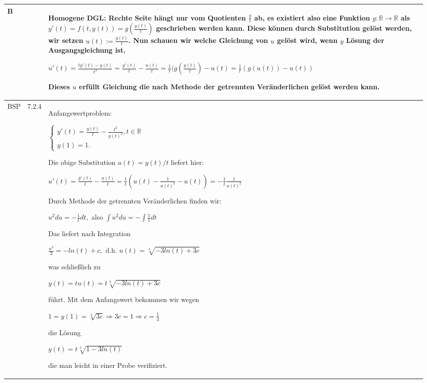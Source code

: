     \begin{longtable}{p{0.75cm} p{1cm} p{16cm}}
        \toprule

        B   &       &   Homogene DGL: Rechte Seite hängt nur vom Quotienten $\frac{y}{t}$ ab, es existiert also eine Funktion $g: \mathbb{R} \rightarrow \mathbb{R}$
                        als $y'(t) = f(t,y(t)) = g(\frac{y(t)}{t})$ geschrieben werden kann. \hfill \break
                        Diese können durch Substitution gelöst werden, wir setzen $u(t) := \frac{y(t)}{t}$. \hfill \break
                        Nun schauen wir welche Gleichung von $u$ gelöst wird, wenn $y$ Lösung der Ausgangsgleichung ist. \hfill \break
                        \centerline{$ u'(t) = \frac{ty'(t)-y(t)}{t^2} = \frac{y'(t)}{t} - \frac{u(t)}{t} = \frac{1}{t} (g(\frac{y(t)}{t}) - u(t)
                        = \frac{1}{t}(g(u(t))-u(t)) $} 
                        Dieses $u$ erfüllt Gleichung die nach Methode der getrennten Veränderlichen gelöst werden kann.\\
        \midrule
        BSP & 7.2.4 &   Anfangswertproblem: \hfill \break
                        \centerline{$   \begin{cases}
                                        y'(t) = \frac{y(t)}{t} - \frac{t^2}{y(t)^2}, t \in \mathbb{R} \\
                                        y(1) = 1. 
                                        \end{cases} $} 
                        Die obige Substitution $u(t) = y(t)/t$ liefert hier: \hfill \break
                        \centerline{$ u'(t)= \frac{y'(t)}{t} - \frac{u(t)}{t} = \frac{1}{t} (u(t) - \frac{1}{u(t)^2}-u(t)) = - \frac{1}{t} \frac{1}{u(t)^2} $} 
                        Durch Methode der getrennten Veränderlichen finden wir: \hfill \break
                        \centerline{$ u^2du=-\frac{1}{t}dt,$ also $\int u^2 du= -\int \frac{1}{t}dt$} 
                        Das liefert nach Integration \hfill \break
                        \centerline{$ \frac{u^3}{3} = -ln(t)+c,$ d.h. $ u(t) = \sqrt[3]{-3ln(t)+3c} $}
                        was schließlich zu \hfill \break
                        \centerline{$ y(t) = tu(t) = t \sqrt[3]{-3ln(t) +3c} $}
                        führt. Mit dem Anfangswert bekommen wir wegen \hfill \break
                        \centerline{$ 1 = y(1) = \sqrt[3]{3c} \Rightarrow 3c = 1 \Rightarrow c = \frac{1}{3} $}
                        die Lösung \hfill \break
                        \centerline{$ y(t) = t \sqrt[3]{1-3ln(t)} $}
                        die man leicht in einer Probe verifiziert. \\
        \bottomrule
    \end{longtable}

